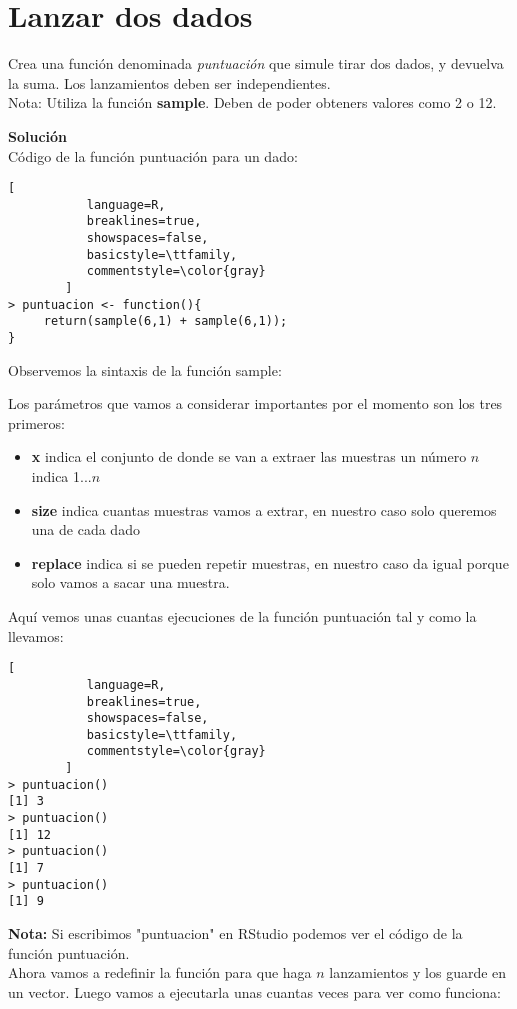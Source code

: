 \documentclass[11pt,fleqn]{book} %
\begin{document}
\section{Lanzar dos dados}
\begin{exercise}
	Crea una función denominada \textit{puntuación} que simule tirar dos dados, y devuelva la suma. Los lanzamientos deben 	ser independientes.\\
	Nota: Utiliza la función \textbf{sample}. Deben de poder obteners valores como 2 o 12.
\end{exercise}
\textbf{Solución}\\
Código de la función puntuación para un dado:
\begin{lstlisting}[
           language=R,
           breaklines=true,
           showspaces=false,
           basicstyle=\ttfamily,
           commentstyle=\color{gray}
        ]
> puntuacion <- function(){
     return(sample(6,1) + sample(6,1));
}
\end{lstlisting}
Observemos la sintaxis de la función sample:\\
\begin{sintaxis}[sample(x, size, replace = FALSE, prob = NULL)]
Los parámetros que vamos a considerar importantes por el momento son los tres primeros:
\begin{itemize}
\item \textbf{x} indica el conjunto de donde se van a extraer las muestras un número $n$ indica 1...$n$
\item \textbf{size} indica cuantas muestras vamos a extrar, en nuestro caso solo queremos una de cada dado
\item \textbf{replace} indica si se pueden repetir muestras, en nuestro caso da igual porque solo vamos a sacar una muestra.
\end{itemize}
\end{sintaxis}
Aquí vemos unas cuantas ejecuciones de la función puntuación tal y como la llevamos:
\begin{lstlisting}[
           language=R,
           breaklines=true,
           showspaces=false,
           basicstyle=\ttfamily,
           commentstyle=\color{gray}
        ]
> puntuacion()
[1] 3
> puntuacion()
[1] 12
> puntuacion()
[1] 7
> puntuacion()
[1] 9
\end{lstlisting}
\textbf{Nota:} Si escribimos "puntuacion" en RStudio podemos ver el código de la función puntuación.\\
Ahora vamos a redefinir la función para que haga $n$ lanzamientos y los guarde en un vector. Luego vamos a ejecutarla unas cuantas veces para ver como funciona:
\end{document}
